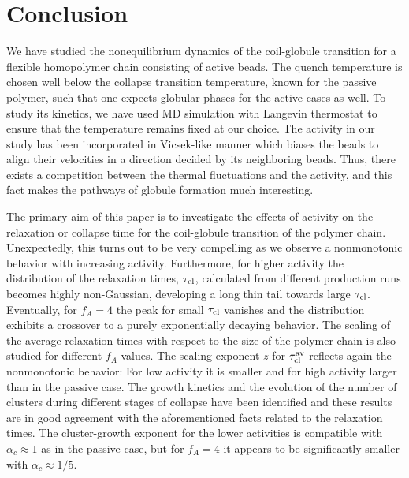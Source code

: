 \documentclass[aps,prx,reprint,showpacs,showkeys,noeprint,longbibliography]{revtex4-1} %
\begin{document}
\section{ Conclusion}\label{conclusion}
We have studied the nonequilibrium dynamics of the coil-globule transition for a flexible homopolymer chain consisting of active beads. 
The quench temperature is chosen well below the collapse transition temperature, known for the passive polymer, 
such that one expects globular phases for the active cases as well. To study its kinetics, we have used MD simulation with Langevin thermostat 
to ensure that the temperature remains fixed at our choice.
The activity in our study has been incorporated in Vicsek-like manner which biases the beads to align 
their velocities in a direction decided by its neighboring beads. Thus, there exists a 
competition between the thermal fluctuations and the activity, and this fact makes the pathways of globule formation much interesting.
\par 
The primary aim of this paper is to investigate the effects of  activity on the relaxation or 
collapse time for the coil-globule transition of the polymer chain. Unexpectedly, this turns out to be very compelling as we observe a nonmonotonic behavior with increasing activity. 
Furthermore, for higher activity the distribution of the relaxation times,  $\tau_{\rm{cl}}$, calculated from different production runs becomes highly non-Gaussian, developing a long thin tail towards large $\tau_{\rm{cl}}$.  Eventually, for $f_A=4$ the peak for small $\tau_{\rm{cl}}$ vanishes and the distribution exhibits a crossover to a purely exponentially decaying behavior. The scaling of the average relaxation times with respect to the size of the polymer chain is also studied for different $f_A$ values.
The scaling exponent $z$ for $\tau_{\rm{cl}}^{\rm{av}}$ reflects again the nonmonotonic behavior: For low activity it is smaller and for high activity larger than in the passive case. The growth kinetics and the evolution of the
number of clusters during different stages of collapse have been identified and these results are in good agreement with the aforementioned facts related to the relaxation times. %
The cluster-growth exponent for the lower activities is compatible with $\alpha_c \approx 1$ as in the passive case, but for $f_A=4$ it appears to be significantly smaller with $\alpha_c \approx 1/5$. 
 
\end{document}
